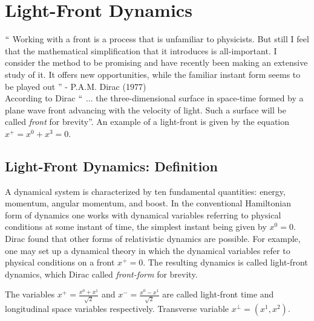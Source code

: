 \documentclass[12pt,a4paper]{report}
\begin{document}
\chapter{Light-Front Dynamics}
$``$ Working with a front is a process that is unfamiliar to physicists. But still I feel that the mathematical simplification that it introduces is all-important. I consider the method to be promising and have recently been making an extensive study of it. It offers new opportunities, while the familiar instant form seems to be played out '' - P.A.M. Dirac (1977)\\
According to Dirac \cite{Dirac} $``$ ... the three-dimensional surface in
space-time formed by a plane wave front advancing with the velocity of light.
Such a surface will be called {\it front} for brevity''. 
An example of a light-front is given by the equation $x^+ = x^0 + x^3=0$.
\section{Light-Front Dynamics: Definition}
A dynamical system is characterized by ten fundamental quantities:
energy, momentum, angular momentum, and boost. In the conventional 
Hamiltonian form of dynamics one works with dynamical variables referring 
to physical conditions at some instant of time,  the simplest instant being 
given by  $x^0=0$. Dirac found that other forms of relativistic
dynamics are possible. For example, one may set up a dynamical theory in
which the dynamical variables refer to physical conditions on a front
$x^+=0$. The resulting dynamics is called light-front dynamics, which Dirac
called {\it front-form} for brevity.  \cite{Harindranath} 
           

The variables $x^+=\frac{x^0+x^1}{\sqrt{2}}$ and  $x^- = \frac{x^0-x^1}{\sqrt{2}}$ are called light-front
time and longitudinal space variables respectively. Transverse variable
$x^\perp =(x^1,x^2)$. 
\end{document}
